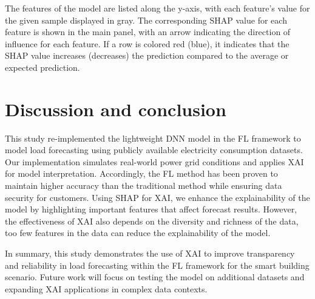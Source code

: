 \documentclass[11pt,a4paper]{article}
\begin{document}
The features of the model are listed along the y-axis, with each feature's value for the given sample displayed in gray. The corresponding SHAP value for each feature is shown in the main panel, with an arrow indicating the direction of influence for each feature. If a row is colored red (blue), it indicates that the SHAP value increases (decreases) the prediction compared to the average or expected prediction.

\section{Discussion and conclusion}
This study re-implemented \cite{duttagupta2023exploring} the lightweight DNN model in the FL framework to model load forecasting using publicly available electricity consumption datasets. Our implementation simulates real-world power grid conditions and applies XAI for model interpretation. Accordingly, the FL method has been proven to maintain higher accuracy than the traditional method while ensuring data security for customers.
Using SHAP for XAI, we enhance the explainability of the model by highlighting important features that affect forecast results.  However, the effectiveness of XAI also depends on the diversity and richness of the data, too few features in the data can reduce the explainability of the model.

In summary, this study demonstrates the use of XAI to improve transparency and reliability in load forecasting within the FL framework for the smart building scenario. Future work will focus on testing the model on additional datasets and expanding XAI applications in complex data contexts.



% 
\end{document}
